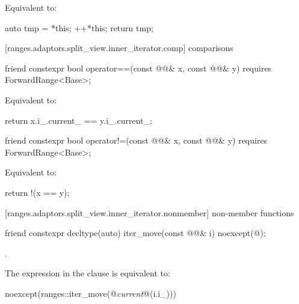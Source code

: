 \begin{itemdescr}
\pnum
\effects Equivalent to:
\begin{codeblock}
auto tmp = *this;
++*this;
return tmp;
\end{codeblock}
\end{itemdescr}

[ranges.adaptors.split_view.inner_iterator.comp]{ comparisons}

%
\begin{itemdecl}
friend constexpr bool operator==(const @@& x, const @@& y)
requires ForwardRange<Base>;
\end{itemdecl}

\begin{itemdescr}
\pnum
\effects Equivalent to:
\begin{codeblock}
return x.i_.current_ == y.i_.current_;
\end{codeblock}
\end{itemdescr}

%
\begin{itemdecl}
friend constexpr bool operator!=(const @@& x, const @@& y)
requires ForwardRange<Base>;
\end{itemdecl}

\begin{itemdescr}
\pnum
\effects Equivalent to:
\begin{codeblock}
return !(x == y);
\end{codeblock}
\end{itemdescr}

[ranges.adaptors.split_view.inner_iterator.nonmember]{ non-member functions}

%
\begin{itemdecl}
friend constexpr decltype(auto) iter_move(const @@& i)
noexcept(@\seebelow@);
\end{itemdecl}

\begin{itemdescr}
\pnum
\returns {}.

\pnum
\remarks The expression in the  clause is equivalent to:
\begin{codeblock}
noexcept(ranges::iter_move(@\textit{current}@(i.i_)))
\end{codeblock}
\end{itemdescr}


